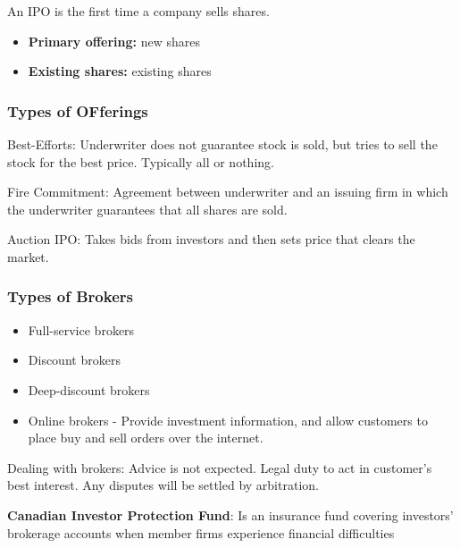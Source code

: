 \documentclass[english, 12pt]{article}
\begin{document}
\begin{defn}
An IPO is the first time a company sells shares.
\begin{itemize}
\item \textbf{Primary offering:} new shares
\item \textbf{Existing shares:} existing shares
\end{itemize}
\end{defn}



\subsubsection*{Types of OFferings}
\begin{defn}
Best-Efforts: Underwriter does not guarantee stock is sold, but tries to sell the stock for the best price. Typically all or nothing.
\end{defn}
\begin{defn}
Fire Commitment: Agreement between underwriter and an issuing firm in which the underwriter guarantees that all shares are sold.
\end{defn}
\begin{defn}
Auction IPO: Takes bids from investors and then sets price that clears the market.
\end{defn}

\subsubsection*{Types of Brokers}
\begin{itemize}
\item Full-service brokers
\item Discount brokers
\item Deep-discount brokers
\item Online brokers - Provide investment information, and allow customers to place buy and sell orders over the internet.
\end{itemize}
\begin{defn}
Dealing with brokers: Advice is not expected. Legal duty to act in customer's best interest. Any disputes will be settled by arbitration.
\end{defn}
\begin{defn}
\textbf{Canadian Investor Protection Fund}: Is an insurance fund covering investors' brokerage accounts when member firms experience financial difficulties
\end{defn}
\end{document}
